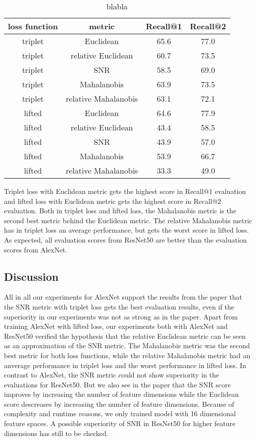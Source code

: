 \documentclass[12pt,paper=a4]{scrartcl}
\theoremstyle{break}
\begin{document}
\begin{table}[h]
\centering
  \begin{tabular}{| c | c | c | c |}
    \hline
     loss function & metric & Recall@1 & Recall@2 \\ \hline \hline
    triplet & Euclidean & 65.6 & 77.0 \\ \hline
    triplet & relative Euclidean & 60.7 & 73.5 \\ \hline
    triplet & SNR & 58.5 & 69.0 \\ \hline
    triplet & Mahalanobis & 63.9 & 73.5 \\ \hline
    triplet & relative Mahalanobis & 63.1 & 72.1 \\ \hline
    lifted & Euclidean & 64.6 & 77.9 \\ \hline
    lifted & relative Euclidean & 43.4 & 58.5 \\ \hline
    lifted & SNR & 43.9 & 57.0 \\ \hline
    lifted & Mahalanobis & 53.9 & 66.7 \\ \hline
    lifted & relative Mahalanobis & 33.3 & 49.0 \\ \hline

  \end{tabular}
  \caption{blabla}
\end{table}
Triplet loss with Euclidean metric gets the highest score in Recall@1 evaluation and lifted loss with Euclidean metric gets the highest score in Recall@2 evaluation. Both in triplet loss and lifted loss, the Mahalanobis metric is the second best metric behind the Euclidean metric. The relative Mahalanobis metric has in triplet loss an average performance, but gets the worst score in lifted loss. As expected, all evaluation scores from ResNet50 are better than the evaluation scores from AlexNet.
\subsection{Discussion}
All in all our experiments for AlexNet support the results from the paper that the SNR metric with triplet loss gets the best evaluation results, even if the superiority in our experiments was not as strong as in the paper. Apart from training AlexNet with lifted loss, our experiments both with AlexNet and ResNet50 verified the hypothesis that the relative Euclidean metric can be seen as an approximation of the SNR metric. The Mahalanobis metric was the second best metric for both loss functions, while the relative Mahalanobis metric had an anverage performance in triplet loss and the worst performance in lifted loss. In contrast to AlexNet, the SNR metric could not show superiority in the evaluations for ResNet50. But we also see in the paper that the SNR score improves by increasing the number of feature dimensions while the Euclidean score descreases by increasing the number of feature dimensions. Because of complexity and runtime reasons, we only trained model with 16 dimensional feature spaces. A possible superiority of SNR in ResNet50 for higher feature dimensions has still to be checked.
\end{document}
